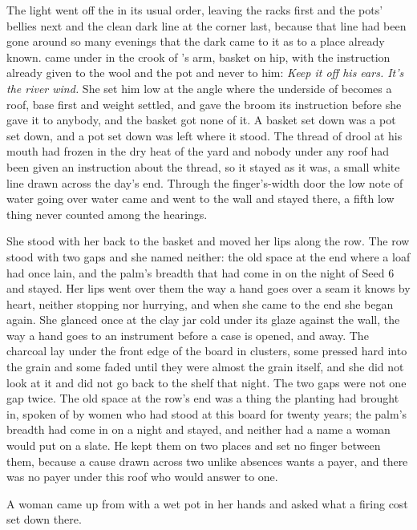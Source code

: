 The light went off the  in its usual order, leaving the racks first and the pots' bellies next and the clean dark line at the corner last, because that line had been gone around so many evenings that the dark came to it as to a place already known.  came under  in the crook of 's arm, basket on hip, with the instruction already given to the wool and the pot and never to him: \emph{Keep it off his ears. It’s the river wind.} She set him low at the angle where the underside of  becomes a roof, base first and weight settled, and gave the broom its instruction before she gave it to anybody, and the basket got none of it. A basket set down was a pot set down, and a pot set down was left where it stood. The thread of drool at his mouth had frozen in the dry heat of the yard and nobody under any roof had been given an instruction about the thread, so it stayed as it was, a small white line drawn across the day's end. Through the finger's-width door the low note of water going over water came and went to the wall and stayed there, a fifth low thing never counted among the hearings.

She stood with her back to the basket and moved her lips along the row. The row stood with two gaps and she named neither: the old space at the end where a loaf had once lain, and the palm's breadth that had come in on the night of Seed 6 and stayed. Her lips went over them the way a hand goes over a seam it knows by heart, neither stopping nor hurrying, and when she came to the end she began again. She glanced once at the clay jar cold under its glaze against the wall, the way a hand goes to an instrument before a case is opened, and away. The charcoal lay under the front edge of the board in clusters, some pressed hard into the grain and some faded until they were almost the grain itself, and she did not look at it and did not go back to the shelf that night. The two gaps were not one gap twice. The old space at the row's end was a thing the planting had brought in, spoken of by women who had stood at this board for twenty years; the palm's breadth had come in on a night and stayed, and neither had a name a woman would put on a slate. He kept them on two places and set no finger between them, because a cause drawn across two unlike absences wants a payer, and there was no payer under this roof who would answer to one.

A woman came up from  with a wet pot in her hands and asked what a firing cost set down there.

